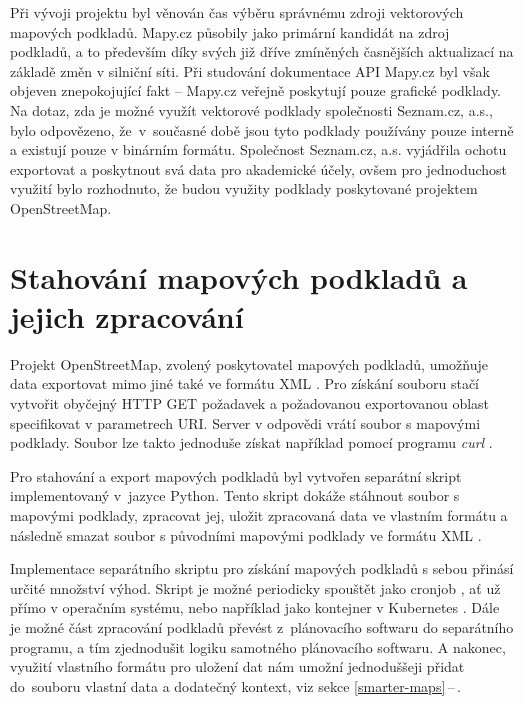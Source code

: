 \documentclass[czech, bachelor]{diploma}
\newcommand{\peteref}[1]{\ref{#1}\,--\,\nameref{#1}}
\begin{document}
Při vývoji projektu byl věnován čas výběru správnému zdroji vektorových mapových podkladů. Mapy.cz působily jako primární kandidát
na zdroj podkladů, a to především díky svých již dříve zmíněných časnějších aktualizací na základě změn v silniční síti.
Při studování dokumentace API Mapy.cz byl však objeven znepokojující fakt -- Mapy.cz veřejně poskytují pouze grafické podklady.
Na dotaz, zda je možné využít vektorové podklady společnosti Seznam.cz, a.s., bylo odpovězeno, že~v~současné době jsou tyto
podklady používány pouze interně a existují pouze v binárním formátu. Společnost Seznam.cz, a.s. vyjádřila ochotu exportovat
a poskytnout svá data pro akademické účely, ovšem pro jednoduchost využití bylo rozhodnuto, že budou využity podklady poskytované
projektem OpenStreetMap.

\section{Stahování mapových podkladů a jejich zpracování}

Projekt OpenStreetMap, zvolený poskytovatel mapových podkladů, umožňuje data exportovat mimo jiné také ve formátu XML \cite{
openstreetmap-export-source, xml-source}. Pro získání souboru stačí vytvořit obyčejný HTTP GET \cite{http-source} požadavek a
požadovanou exportovanou oblast specifikovat v parametrech URI. Server v odpovědi vrátí soubor s mapovými podklady. Soubor lze
takto jednoduše získat například pomocí programu \emph{curl} \cite{curl-source}.

Pro stahování a export mapových podkladů byl vytvořen separátní skript implementovaný v~jazyce Python. Tento skript dokáže
stáhnout soubor s mapovými podklady, zpracovat jej, uložit zpracovaná data ve vlastním formátu a následně smazat soubor
s původními mapovými podklady ve formátu XML \cite{xml-source}.

Implementace separátního skriptu pro získání mapových podkladů s sebou přinásí určité množství výhod. Skript je možné periodicky
spouštět jako cronjob \cite{cron-source}, ať už přímo v operačním systému, nebo například jako kontejner v Kubernetes \cite{
virtualization-source}. Dále je možné část zpracování podkladů převést z~plánovacího softwaru do separátního programu, a tím
zjednodušit logiku samotného plánovacího softwaru. A nakonec, využití vlastního formátu pro uložení dat nám umožní jednoduššeji
přidat do~souboru vlastní data a dodatečný kontext, viz sekce \peteref{smarter-maps}.
\end{document}
